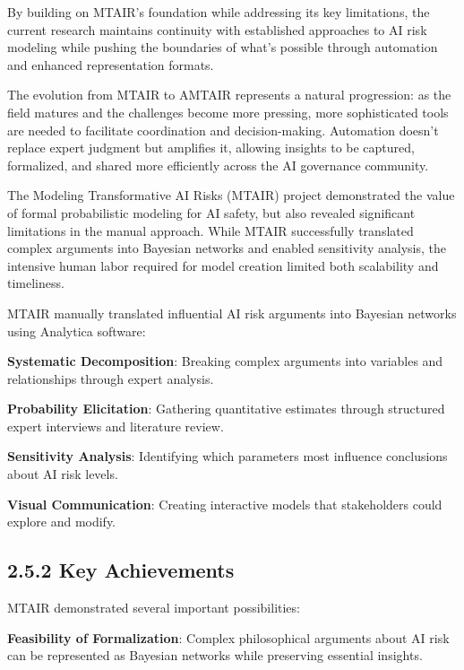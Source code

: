\documentclass[
  11pt,
  letterpaper,
]{book}
\begin{document}
By building on MTAIR's foundation while addressing its key limitations,
the current research maintains continuity with established approaches to
AI risk modeling while pushing the boundaries of what's possible through
automation and enhanced representation formats.

The evolution from MTAIR to AMTAIR represents a natural progression: as
the field matures and the challenges become more pressing, more
sophisticated tools are needed to facilitate coordination and
decision-making. Automation doesn't replace expert judgment but
amplifies it, allowing insights to be captured, formalized, and shared
more efficiently across the AI governance community.

The Modeling Transformative AI Risks (MTAIR) project demonstrated the
value of formal probabilistic modeling for AI safety, but also revealed
significant limitations in the manual approach. While MTAIR successfully
translated complex arguments into Bayesian networks and enabled
sensitivity analysis, the intensive human labor required for model
creation limited both scalability and timeliness.

MTAIR manually translated influential AI risk arguments into Bayesian
networks using Analytica software:

\textbf{Systematic Decomposition}: Breaking complex arguments into
variables and relationships through expert analysis.

\textbf{Probability Elicitation}: Gathering quantitative estimates
through structured expert interviews and literature review.

\textbf{Sensitivity Analysis}: Identifying which parameters most
influence conclusions about AI risk levels.

\textbf{Visual Communication}: Creating interactive models that
stakeholders could explore and modify.

\textcite{clarke2022}

\subsection*{2.5.2 Key Achievements}\label{sec-mtair-achievements}

MTAIR demonstrated several important possibilities:

\textbf{Feasibility of Formalization}: Complex philosophical arguments
about AI risk can be represented as Bayesian networks while preserving
essential insights.
\end{document}
